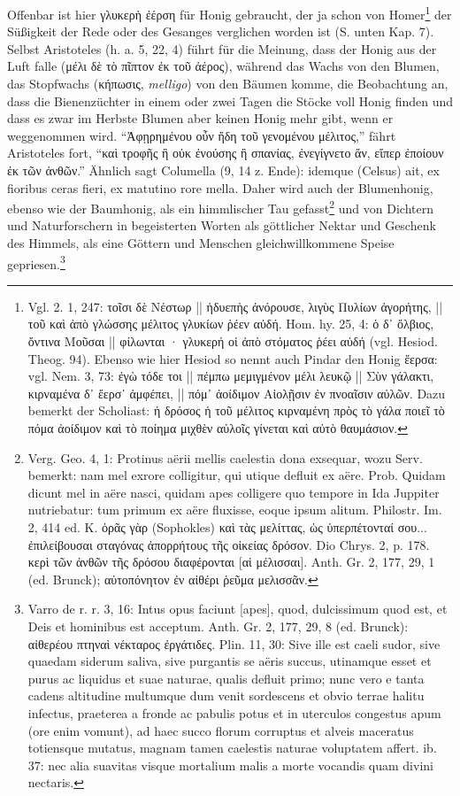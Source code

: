 \documentclass[a4paper, 11pt, oneside]{article}
\begin{document}
Offenbar ist hier γλυκερὴ ἐέρση für Honig gebraucht, der ja schon von Homer\footnote{Vgl. 2. 1, 247: τοῖσι δὲ Νέστωρ || ἡδυεπὴς ἀνόρουσε, λιγὺς Πυλίων ἀγορήτης, || τοῦ καὶ ἀπὸ γλώσσης μέλιτος γλυκίων ῥέεν αὐδή. Hom. hy. 25, 4: ὁ δ᾽ ὄλβιος, ὄντινα Μοῦσαι || φίλωνται · γλυκερή οἱ ἀπὸ στόματος ῥέει αὐδή (vgl. Hesiod. Theog. 94). Ebenso wie hier Hesiod so nennt auch Pindar den Honig ἔερσα: vgl. Nem. 3, 73: ἐγὼ τόδε τοι || πέμπω μεμιγμένον μέλι λευκῷ || Σὺν γάλακτι, κιρναμένα δ᾽ ἔερσ᾽ ἀμφέπει, || πόμ᾽ ἀοίδιμον Αἰολῇσιν ἐν πνοαῖσιν αὐλῶν. Dazu bemerkt der Scholiast: ἡ δρόσος ἡ τοῦ μέλιτος κιρναμένη πρὸς τὸ γάλα ποιεῖ τὸ πόμα ἀοίδιμον καὶ τὸ ποίημα μιχθὲν αὐλοῖς γίνεται καὶ αὐτὸ θαυμάσιον.} der Süßigkeit der Rede oder des Gesanges verglichen worden ist (S. unten Kap. 7). Selbst Aristoteles (h. a. 5, 22, 4) führt für die Meinung, dass der Honig aus der Luft falle (μέλι δὲ τὸ πῖπτον ἐκ τοῦ ἀέρος), während das Wachs von den Blumen, das Stopfwachs (κήπωσις, \emph{melligo}) von den Bäumen komme, die Beobachtung an, dass die Bienenzüchter in einem oder zwei Tagen die Stöcke voll Honig finden und dass es zwar im Herbste Blumen aber keinen Honig mehr gibt, wenn er weggenommen wird. "`Ἀφῃρημένου οὖν ἤδη τοῦ γενομένου μέλιτος,"' fährt Aristoteles fort, "`καὶ τροφῆς ἢ οὐκ ἐνούσης ἢ σπανίας, ἐνεγίγνετο ἄν, εἴπερ ἐποίουν ἐκ τῶν ἀνθῶν."' Ähnlich sagt Columella (9, 14 z. Ende): idemque (Celsus) ait, ex fioribus ceras fieri, ex matutino rore mella. Daher wird auch der Blumenhonig, ebenso wie der Baumhonig, als ein himmlischer Tau gefasst\footnote{Verg. Geo. 4, 1: Protinus aërii mellis caelestia dona exsequar, wozu Serv. bemerkt: nam mel exrore colligitur, qui utique defluit ex aëre. Prob. Quidam dicunt mel in aëre nasci, quidam apes colligere quo tempore in Ida Juppiter nutriebatur: tum primum ex aëre fluxisse, eoque ipsum alitum. Philostr. Im. 2, 414 ed. K. ὁρᾶς γὰρ (Sophokles) καὶ τὰς μελίττας, ὡς ὑπερπέτονταί σου... ἐπιλείβουσαι σταγόνας ἀπορρήτους τῆς οἰκείας δρόσον. Dio Chrys. 2, p. 178. κερὶ τῶν ἀνθῶν τῆς δρόσου διαφέρονται [αἱ μέλισσαι]. Anth. Gr. 2, 177, 29, 1 (ed. Brunck); αὐτοπόνητον ἐν αἰθέρι ῥεῦμα μελισσᾶν.} und von Dichtern und Naturforschern in begeisterten Worten als göttlicher Nektar und Geschenk des Himmels, als eine Göttern und Menschen gleichwillkommene Speise gepriesen.\footnote{Varro de r. r. 3, 16: Intus opus faciunt [apes], quod, dulcissimum quod est, et Deis et hominibus est acceptum. Anth. Gr. 2, 177, 29, 8 (ed. Brunck): αἰθερέου πτηναὶ νέκταρος ἐργάτιδες. Plin. 11, 30: Sive ille est caeli sudor, sive quaedam siderum saliva, sive purgantis se aëris succus, utinamque esset et purus ac liquidus et suae naturae, qualis defluit primo; nunc vero e tanta cadens altitudine multumque dum venit sordescens et obvio terrae halitu infectus, praeterea a fronde ac pabulis potus et in uterculos congestus apum (ore enim vomunt), ad haec succo florum corruptus et alveis maceratus totiensque mutatus, magnam tamen caelestis naturae voluptatem affert. ib. 37: nec alia suavitas visque mortalium malis a morte vocandis quam divini nectaris.}
\end{document}
